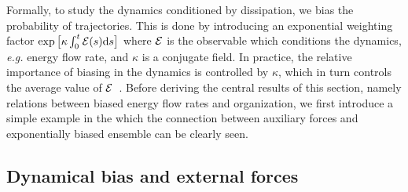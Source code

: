 \documentclass[superscriptaddress, twocolumn, prx, longbibliography, nofootinbib]{revtex4-1}
\providecommand{\DIFdelbegin}{} %
\providecommand{\DIFdelend}{} %
\begin{document}
Formally, to study the dynamics conditioned by dissipation, we bias the probability of trajectories. This is done by introducing an exponential weighting factor $\exp\big[\kappa\int_0^t{\cal E}(s){\rm d}s\big]$ where ${\cal E}$ is the observable which conditions the dynamics, {\it e.g.} energy flow rate, and $\kappa$ is a conjugate field. In practice, the relative importance of biasing in the dynamics is controlled by $\kappa$, which in turn controls the average value of $\cal E$~\cite{Touchette2009}. Before deriving the central results of this section, namely relations between biased energy flow rates and organization, we first introduce a simple example in the which the connection between auxiliary forces and exponentially biased ensemble can be clearly seen.




\subsection{\DIFdelbegin %
\DIFdelend Dynamical bias and external forces\DIFdelbegin %
\DIFdelend }\label{sec:biasexternal}
\end{document}
